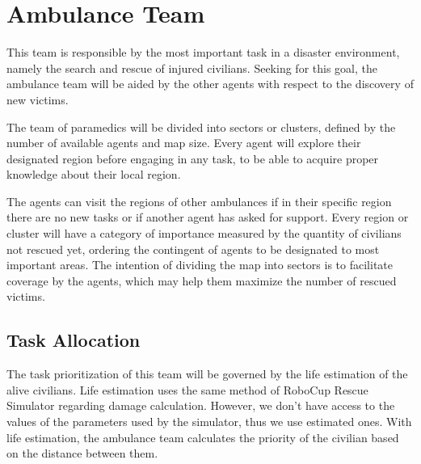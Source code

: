 \section{Ambulance Team}
\label{sec:ambulance}

This team is responsible by the most important task in a disaster environment, namely the search and rescue of injured civilians. Seeking for this goal, the ambulance team will be aided by the other agents with respect to the discovery of new victims.

The team of paramedics will be divided into sectors or clusters, defined by the number of available agents and map size. Every agent will explore their designated region before engaging in any task, to be able to acquire proper knowledge about their local region. 

The agents can visit the regions of other ambulances if in their specific region there are no new tasks or if another agent has asked for support. Every region or cluster will have a category of importance measured by the quantity of civilians not rescued yet, ordering the contingent of agents to be designated to most important areas. The intention of dividing the map into sectors is to facilitate coverage by the agents, which may help them maximize the number of rescued victims.


\subsection{Task Allocation}

The task prioritization of this team will be governed by the life estimation of the alive civilians. Life estimation uses the same method of RoboCup Rescue Simulator regarding damage calculation. However, we don't have access to the values of the parameters used by the simulator, thus we use estimated ones. With life estimation, the ambulance team calculates the priority of the civilian based on the distance between them.



